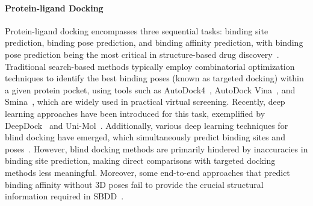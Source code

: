 \paragraph{Protein-ligand Docking}
Protein-ligand docking encompasses three sequential tasks: binding site prediction, binding pose prediction, and binding affinity prediction, with binding pose prediction being the most critical in structure-based drug discovery~\citep{SBDDsurvey2}. Traditional search-based methods typically employ combinatorial optimization techniques to identify the best binding poses (known as targeted docking) within a given protein pocket, using tools such as AutoDock4~\citep{AutoDock4}, AutoDock Vina~\citep{AutoDockVina,AutoDockVina2}, and Smina~\citep{Smina}, which are widely used in practical virtual screening. Recently, deep learning approaches have been introduced for this task, exemplified by DeepDock~\citep{DeepDock} and Uni-Mol~\citep{Uni-Mol}. Additionally, various deep learning techniques for blind docking have emerged, which simultaneously predict binding sites and poses~\citep{EquiBind,TankBind,E3Bind,FABind,DiffDock,DiffDock-L}. However, blind docking methods are primarily hindered by inaccuracies in binding site prediction, making direct comparisons with targeted docking methods less meaningful. Moreover, some end-to-end approaches that predict binding affinity without 3D poses fail to provide the crucial structural information required in SBDD~\citep{AffinityPredSurvey}.


